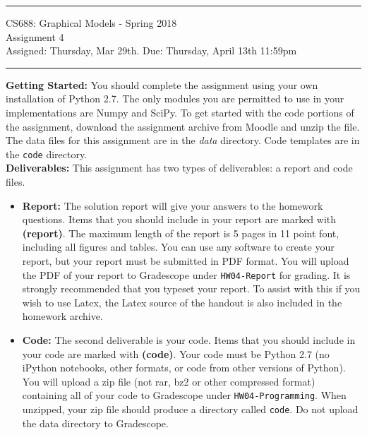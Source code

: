 \documentclass[11pt]{article}
\begin{document}
{\centering
  \rule{6.3in}{2pt}
  \vspace{1em}
  \Large{
    CS688: Graphical Models - Spring 2018\\
    Assignment 4\\
  }
  \vspace{1em}
  Assigned: Thursday, Mar 29th. Due: Thursday, April 13th 11:59pm\\
  \vspace{0.1em}
  \rule{6.3in}{1.5pt}
}
\vspace{1pc}

\textbf{Getting Started:} You should complete the assignment using your own installation of Python 2.7. The only modules you are permitted to use in your implementations are Numpy and SciPy. To get started with the code portions of the assignment, download the assignment archive from Moodle and unzip the file. The data files for this assignment are in the \textit{data} directory. Code templates are in the \texttt{code} directory.\\

\textbf{Deliverables:} This assignment has two types of deliverables: a report and code files.

\begin{itemize}
\item \textbf{Report: } The solution report will give your answers to the homework questions. Items that you should include in your report are marked with \textbf{(report)}. The maximum length of the report is 5 pages in 11 point font, including all figures and tables. You can use any software to create your report, but your report must be submitted in PDF format. You will upload the PDF of your report to Gradescope under \verb|HW04-Report| for grading. It is strongly recommended that you typeset your report. To assist with this if you wish to use Latex, the Latex source of the handout is also included in the homework archive.

\item \textbf{Code: } The second deliverable is your code. Items that you should include in your code are marked with \textbf{(code)}.  Your code must be Python 2.7 (no iPython notebooks, other formats, or code from other versions of Python). You will upload a zip file (not rar, bz2 or other compressed format) containing all of your code to Gradescope under \verb|HW04-Programming|.  When unzipped, your zip file should produce a directory called \verb|code|. Do not upload the data directory to Gradescope.

\end{itemize}
\vspace{0.5em}
\end{document}
